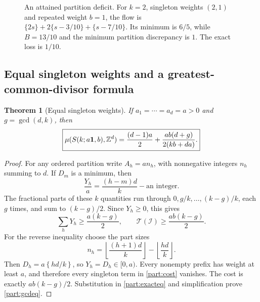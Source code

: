 \documentclass[11pt,a4paper]{article}
\newtheorem{theorem}{Theorem}[section]
\theoremstyle{remark}\newtheorem{remark}[theorem]{Remark}
\newcommand{\fr}[1]{\left\{#1\right\}}\newcommand{\one}{\mathbf1}
\begin{document}
\begin{figure}[ht]
\centering
{}
\caption{An attained partition deficit. For $k=2$, singleton weights
$(2,1)$ and repeated weight $b=1$, the flow is
$\{2s\}+2\{s-3/10\}+\{s-7/10\}$.
Its minimum is $6/5$, while $B=13/10$ and the minimum partition
discrepancy is $1$. The exact loss is $1/10$.}
\label{fig:partitiondeficit}
\end{figure}

\subsection{Equal singleton weights and a greatest-common-divisor formula}

\begin{theorem}[Equal singleton weights]\label{part:gcd}
If $a_1=\cdots=a_d=a>0$ and $g=\gcd(d,k)$, then
\begin{equation}\label{part:gcdeq}
 \boxed{\displaystyle
 \mu(S(k;a\one,b),\Z^d)
 =\frac{(d-1)a}{2}+\frac{ab(d+g)}{2(kb+da)}.}
\end{equation}
\end{theorem}

\begin{proof}
For any ordered partition write $A_h=an_h$, with nonnegative
integers $n_h$ summing to $d$.  If $D_m$ is a minimum, then
\[
 \frac{Y_h}{a}
 =\frac{(h-m)d}{k}-\text{an integer}.
\]
The fractional parts of these $k$ quantities run through
$0,g/k,\ldots,(k-g)/k$, each $g$ times, and sum to $(k-g)/2$.
Since $Y_h\ge0$, this gives
\[
 \sum_hY_h\ge\frac{a(k-g)}2,
 \qquad \mathcal T(\mathcal I)\ge\frac{ab(k-g)}2.
\]
For the reverse inequality choose the part sizes
\[
 n_h=\left\lfloor\frac{(h+1)d}{k}\right\rfloor
       -\left\lfloor\frac{hd}{k}\right\rfloor.
\]
Then $D_h=a\fr{hd/k}$, so $Y_h=D_h\in[0,a)$.  Every nonempty
prefix has weight at least $a$, and therefore every singleton term
in \eqref{part:cost} vanishes.  The cost is exactly $ab(k-g)/2$.
Substitution in \eqref{part:exacteq} and simplification prove
\eqref{part:gcdeq}.
\end{proof}
\end{document}
